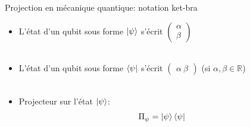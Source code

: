 \documentclass[aspectratio=169,12pt]{beamer}
\begin{document}
\begin{frame}{Projection en mécanique quantique: notation ket-bra}
  \begin{itemize}[<+->]
    \setlength{\itemsep}{0.6em}
    \item L'état d'un qubit sous forme $\ket \psi$ s'écrit $\begin{pmatrix}
    \alpha\\ \beta \end{pmatrix}$ \\~\\
    \item L'état d'un qubit sous forme $\bra \psi$ s'écrit $\begin{pmatrix}
    \alpha \ \beta \end{pmatrix}$ (si $\alpha, \beta \in \mathbb R$) \\~\\
    \item Projecteur sur l'état $\ket \psi$: $$\Pi_\psi^{} = \ket \psi \bra \psi$$ 
  \end{itemize}
\end{frame}
\end{document}
